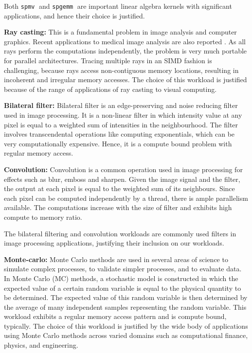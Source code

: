\documentclass[11pt]{article}
\newcommand{\ignore}[1] {}
\newcommand{\sgemm} {{\tt spgemm}}
\newcommand{\spmv} {{\tt spmv}}
\begin{document}
Both \spmv$\;$ and \sgemm$\;$ are important linear algebra kernels with
significant applications, and hence their choice is justified.

{\bf Ray casting: } This is a fundamental problem in image analysis and
computer graphics. Recent applications to medical image analysis are also
reported \cite{rcmed}. As all rays perform the computations independently, the problem is very much portable for parallel architectures. 
Tracing multiple rays in an SIMD fashion is challenging, because rays access non-contiguous
memory locations, resulting in incoherent and irregular memory accesses. 
The choice of this workload is justified because of the range of
applications of ray casting to visual computing.


\ignore {
\item FFT : Fast Fourier Transform, or FFT in short, is a fundamental image
processing primitive with applications to many fields such as digital
signal processing, engineering, astronomy, and the like. Given its
importance, the FFT workload is often used as a benchmark program in
performance analysis of parallel computers and the high performance
computing community. 
}


{\bf Bilateral filter: } Bilateral filter is an edge-preserving and
noise reducing filter used in image processing. It is a non-linear filter
in which intensity value at any pixel is equal to a weighted sum of
intensities in the neighbourhood. The
filter involves transcendental operations like computing exponentials,
which can be very computationally expensive. Hence, it is a compute bound
problem with regular memory access. 

{\bf Convolution: } Convolution is a common operation used in image
processing for effects such as blur, emboss and sharpen. Given the image
signal and the filter, the output at each pixel is equal to the weighted
sum of its neighbours. Since each pixel can be computed independently by a thread,
there is ample parallelism available. The computations increase with the
size of filter and exhibits high compute to memory ratio.


The bilateral filtering and convolution workloads are commonly used
filters in image processing applications, justifying their inclusion on
our workloads.

{\bf Monte-carlo: } Monte Carlo methods are used in several areas of science to
simulate complex processes, to validate simpler processes, and
to evaluate data. In Monte Carlo (MC) methods, a stochastic
model is constructed in which the expected value of a certain
random variable is equal to the physical quantity to be
determined. The expected value of this random variable is then
determined by the average of many independent samples representing
the random variable. This workload exhibits a regular memory access pattern 
and is compute bound, typically. The choice of this workload is justified by the wide body of
applications using Monte Carlo methods across varied domains such as
computational finance, physics, and engineering.
\end{document}
